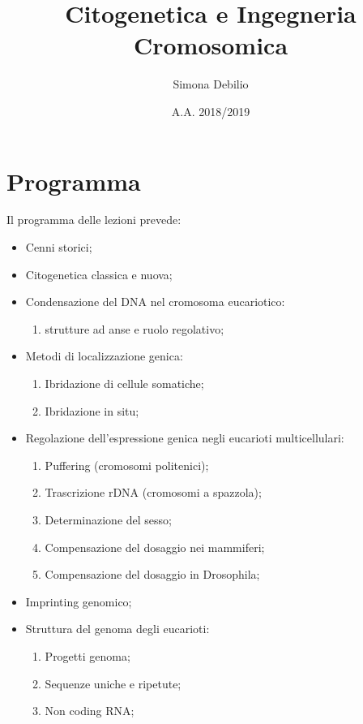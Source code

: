 \documentclass[11pt]{book}
\title{\textbf{Citogenetica e Ingegneria Cromosomica}}
\author{Simona Debilio}
\date{A.A. 2018/2019}
\date{}
\begin{document}
\maketitle

\tableofcontents

\chapter{Programma}

Il programma delle lezioni prevede:

\begin{itemize}
\item 
Cenni storici;
\item 
Citogenetica classica e nuova;
\item 
Condensazione del DNA nel cromosoma eucariotico:

	\begin{enumerate}
	\item strutture ad anse e ruolo regolativo;
	\end{enumerate}

\item 
Metodi di localizzazione genica:

	\begin{enumerate}
	\item
	Ibridazione di cellule somatiche;
	\item 
	Ibridazione in situ;
	\end{enumerate}

\item 
Regolazione dell’espressione genica negli eucarioti multicellulari:

	\begin{enumerate}
	\item 
	Puffering (cromosomi politenici);
    \item 
    Trascrizione rDNA (cromosomi a spazzola);
    \item
    Determinazione del sesso;
    \item
    Compensazione del dosaggio nei mammiferi;
    \item
    Compensazione del dosaggio in Drosophila;
    \end{enumerate}

\item 
Imprinting genomico;
\item
Struttura del genoma degli eucarioti:

	\begin{enumerate}
    \item
    Progetti genoma;
    \item 
    Sequenze uniche e ripetute;
    \item
    Non coding RNA;
    \end{enumerate}
    

\end{itemize}
\end{document}
